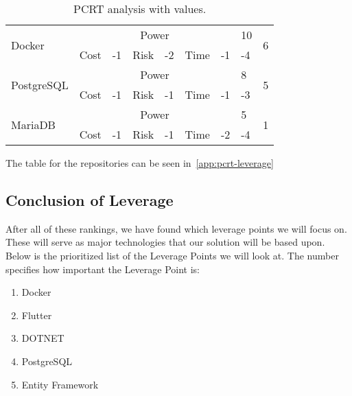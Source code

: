 \begin{table}[h]
{\begin{tabular}{|l|l|l|l|l|l|l|l|c|l|}
    \multirow{2}{*}{Docker} & \multicolumn{6}{c|}{Power} & 10 & \multicolumn{2}{c|}{\multirow{2}{*}{6}} \\ \cline{2-8}
     & Cost & -1 & Risk & -2 & Time & -1 & -4 & \multicolumn{2}{c|}{} \\ \hline
    \multirow{2}{*}{PostgreSQL} & \multicolumn{6}{c|}{Power} & 8 & \multicolumn{2}{c|}{\multirow{2}{*}{5}} \\ \cline{2-8}
     & Cost & -1 & Risk & -1 & Time & -1 & -3 & \multicolumn{2}{c|}{} \\ \hline
    \multirow{2}{*}{MariaDB} & \multicolumn{6}{c|}{Power} & 5 & \multicolumn{2}{c|}{\multirow{2}{*}{1}} \\ \cline{2-8}
     & Cost & -1 & Risk & -1 & Time & -2 & -4 & \multicolumn{2}{c|}{} \\ \hline
    \end{tabular}
    }
    \caption{PCRT analysis with values.}
    \label{tab:pcrt-technologies-leverage}
\end{table}

The table for the repositories can be seen in~\autoref{app:pcrt-leverage}

\subsection{Conclusion of Leverage}\label{subsec:ConclusionOfLeverage}
After all of these rankings, we have found which leverage points we will focus on.
These will serve as major technologies that our solution will be based upon.
Below is the prioritized list of the Leverage Points we will look at.
The number specifies how important the Leverage Point is:

\begin{enumerate}
    \item Docker
    \item Flutter
    \item DOTNET
    \item PostgreSQL
    \item Entity Framework
\end{enumerate}

